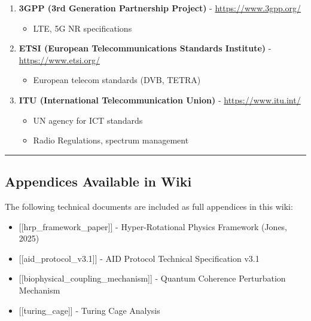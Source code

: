 \begin{enumerate}
\def\labelenumi{\arabic{enumi}.}
\setcounter{enumi}{63}
\tightlist
\item
  \textbf{3GPP (3rd Generation Partnership Project)} - \url{https://www.3gpp.org/}

  \begin{itemize}
  \tightlist
  \item
    LTE, 5G NR specifications
  \end{itemize}
\item
  \textbf{ETSI (European Telecommunications Standards Institute)} - \url{https://www.etsi.org/}

  \begin{itemize}
  \tightlist
  \item
    European telecom standards (DVB, TETRA)
  \end{itemize}
\item
  \textbf{ITU (International Telecommunication Union)} - \url{https://www.itu.int/}

  \begin{itemize}
  \tightlist
  \item
    UN agency for ICT standards
  \item
    Radio Regulations, spectrum management
  \end{itemize}
\end{enumerate}

\begin{center}\rule{0.5\linewidth}{0.5pt}\end{center}

\subsection{\texorpdfstring{ Appendices Available in
Wiki}{ Appendices Available in Wiki}}\label{appendices-available-in-wiki}

The following technical documents are included as full appendices in
this wiki:

\begin{itemize}
\tightlist
\item
  {[}{[}hrp\_framework\_paper{]}{]} - Hyper-Rotational Physics Framework
  (Jones, 2025)
\item
  {[}{[}aid\_protocol\_v3.1{]}{]} - AID Protocol Technical Specification
  v3.1
\item
  {[}{[}biophysical\_coupling\_mechanism{]}{]} - Quantum Coherence
  Perturbation Mechanism
\item
  {[}{[}turing\_cage{]}{]} - Turing Cage Analysis
\end{itemize}

